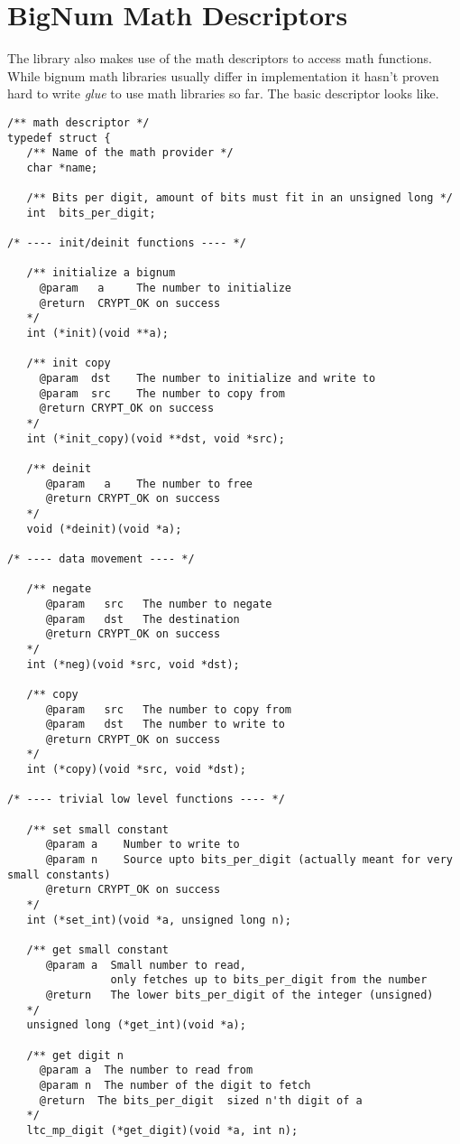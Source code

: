 \documentclass[synpaper]{book}
\newcommand{\mysection}[1]    %
	{                   %
	\section{#1}
   \markboth{\textsf{www.libtom.net}}{\thesection ~ {#1}}
	}
\begin{document}
\mysection{BigNum Math Descriptors}
The library also makes use of the math descriptors to access math functions.  While bignum math libraries usually differ in implementation
it hasn't proven hard to write \textit{glue} to use math libraries so far.  The basic descriptor looks like.

\begin{small}
\begin{verbatim}
/** math descriptor */
typedef struct {
   /** Name of the math provider */
   char *name;

   /** Bits per digit, amount of bits must fit in an unsigned long */
   int  bits_per_digit;

/* ---- init/deinit functions ---- */

   /** initialize a bignum
     @param   a     The number to initialize
     @return  CRYPT_OK on success
   */
   int (*init)(void **a);

   /** init copy
     @param  dst    The number to initialize and write to
     @param  src    The number to copy from
     @return CRYPT_OK on success
   */
   int (*init_copy)(void **dst, void *src);

   /** deinit
      @param   a    The number to free
      @return CRYPT_OK on success
   */
   void (*deinit)(void *a);

/* ---- data movement ---- */

   /** negate
      @param   src   The number to negate
      @param   dst   The destination
      @return CRYPT_OK on success
   */
   int (*neg)(void *src, void *dst);

   /** copy
      @param   src   The number to copy from
      @param   dst   The number to write to
      @return CRYPT_OK on success
   */
   int (*copy)(void *src, void *dst);

/* ---- trivial low level functions ---- */

   /** set small constant
      @param a    Number to write to
      @param n    Source upto bits_per_digit (actually meant for very small constants)
      @return CRYPT_OK on success
   */
   int (*set_int)(void *a, unsigned long n);

   /** get small constant
      @param a  Small number to read,
                only fetches up to bits_per_digit from the number
      @return   The lower bits_per_digit of the integer (unsigned)
   */
   unsigned long (*get_int)(void *a);

   /** get digit n
     @param a  The number to read from
     @param n  The number of the digit to fetch
     @return  The bits_per_digit  sized n'th digit of a
   */
   ltc_mp_digit (*get_digit)(void *a, int n);


\end{verbatim}
\end{small}
\end{document}
